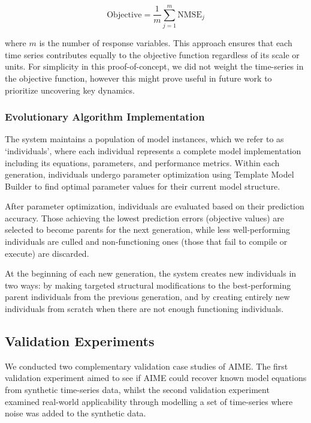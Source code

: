 \begin{equation}
    \text{Objective} = \frac{1}{m} \sum_{j=1}^{m} \text{NMSE}_j
\end{equation}

where $m$ is the number of response variables. This approach ensures that each time series contributes equally to the objective function regardless of its scale or units. For simplicity in this proof-of-concept, we did not weight the time-series in the objective function, however this might prove useful in future work to prioritize uncovering key dynamics.

\subsubsection{Evolutionary Algorithm Implementation}

The system maintains a population of model instances, which we refer to as `individuals', where each individual represents a complete model implementation including its equations, parameters, and performance metrics. Within each generation, individuals undergo parameter optimization using Template Model Builder to find optimal parameter values for their current model structure. 

After parameter optimization, individuals are evaluated based on their prediction accuracy. Those achieving the lowest prediction errors (objective values) are selected to become parents for the next generation, while less well-performing individuals are culled and non-functioning ones (those that fail to compile or execute) are discarded. 

At the beginning of each new generation, the system creates new individuals in two ways: by making targeted structural modifications to the best-performing parent individuals from the previous generation, and by creating entirely new individuals from scratch when there are not enough functioning individuals. 

\subsection{Validation Experiments}

We conducted two complementary validation case studies of AIME. The first validation experiment aimed to see if AIME could recover known model equations from synthetic time-series data, whilst the second validation experiment examined real-world applicability through modelling a set of time-series where noise was added to the synthetic data.

